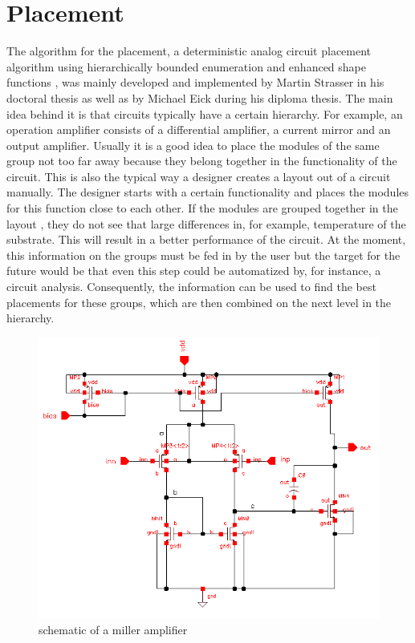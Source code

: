 \chapter{Placement}
The algorithm for the placement, a deterministic analog circuit placement algorithm using hierarchically bounded enumeration and enhanced shape functions \cite{iccad:plantage}, was mainly developed and implemented by Martin Strasser in his doctoral thesis as well as by Michael Eick during his diploma thesis. The main idea behind it is that circuits typically have a certain hierarchy. For example, an operation amplifier  consists of a differential amplifier, a current mirror and an output amplifier. Usually it is a good idea to place the modules of the same group not too far away because they belong together in the functionality of the circuit. This is also the typical way a designer creates a layout out of a circuit manually. The designer starts with a certain functionality and places the modules for this function close to each other. If the modules are grouped together in the layout , they do not see that large differences in, for example, temperature of the substrate. This will result in a better performance of the circuit.
At the moment, this information on the groups must be fed in by the user but the target for the future would be that even this step could be automatized by, for instance, a circuit analysis. Consequently, the information can be used to find the best placements for these groups, which are then combined on the next level in the hierarchy.

\begin{figure}	
	\centering	
	\includegraphics[scale=0.6]{FIG/miller_amplifier_schematic.png}	
	\caption{schematic of a miller amplifier}	
	\label{fig:miller_amplifier_schematic}
\end{figure}

